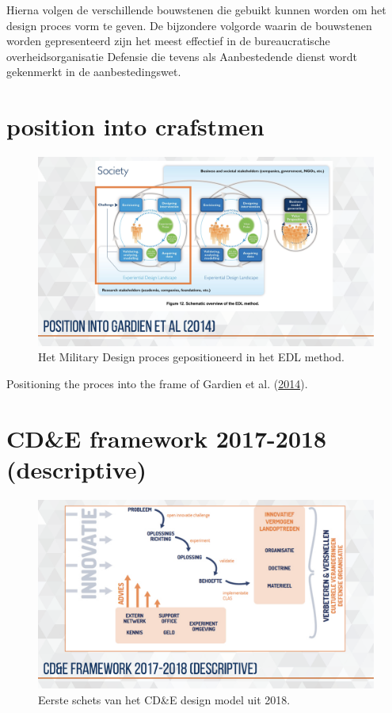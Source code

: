 \documentclass[
]{book}
\begin{document}
Hierna volgen de verschillende bouwstenen die gebuikt kunnen worden om het design proces vorm te geven. De bijzondere volgorde waarin de bouwstenen worden gepresenteerd zijn het meest effectief in de bureaucratische overheidsorganisatie Defensie die tevens als Aanbestedende dienst wordt gekenmerkt in de aanbestedingswet.

\hypertarget{position-into-crafstmen}{%
\section{position into crafstmen}\label{position-into-crafstmen}}

\begin{figure}

{\centering \includegraphics[width=0.5\linewidth]{data/keynote-slides/20200430-CDE-Designprocess/20200430-CDE-Designprocess.019} 

}

\caption{Het Military Design proces gepositioneerd in het EDL method.}\label{fig:unnamed-chunk-15}
\end{figure}

Positioning the proces into the frame of Gardien et al. (\protect\hyperlink{ref-gardien_changing_2014}{2014}).

\hypertarget{cde-framework-2017-2018-descriptive}{%
\section{CD\&E framework 2017-2018 (descriptive)}\label{cde-framework-2017-2018-descriptive}}

\begin{figure}

{\centering \includegraphics[width=0.5\linewidth]{data/keynote-slides/20200430-CDE-Designprocess/20200430-CDE-Designprocess.020} 

}

\caption{Eerste schets van het CD\&E design model uit 2018. }\label{fig:unnamed-chunk-16}
\end{figure}
\end{document}
